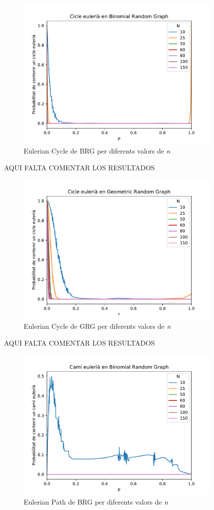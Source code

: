 \begin{figure}[H]
    \centering
    \includegraphics[width=10cm]{plots/BRG_eulerianCycle.pdf}
    \caption{Eulerian Cycle de BRG per diferents valors de \textit{n}}
    \label{fig:connect_04}
\end{figure}

AQUI FALTA COMENTAR LOS RESULTADOS

\begin{figure}[H]
    \centering
    \includegraphics[width=10cm]{plots/GRG_eulerianCycle.pdf}
    \caption{Eulerian Cycle de GRG per diferents valors de \textit{n}}
    \label{fig:connect_04}
\end{figure}

AQUI FALTA COMENTAR LOS RESULTADOS

\begin{figure}[H]
    \centering
    \includegraphics[width=10cm]{plots/BRG_eulerianPath.pdf}
    \caption{Eulerian Path de BRG per diferents valors de \textit{n}}
    \label{fig:connect_04}
\end{figure}

